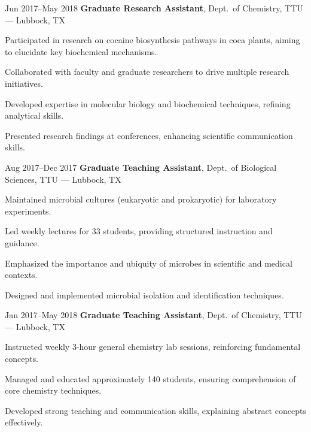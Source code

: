 \documentclass{resume}
\begin{document}
        \begin{twocolentry}{Jun 2017--May 2018}
            \textbf{Graduate Research Assistant}, Dept.\ of Chemistry, TTU --- Lubbock, TX
        \end{twocolentry}
        \begin{onecolentry}
            \begin{highlights}
                \item Participated in research on cocaine biosynthesis pathways in coca plants, aiming to elucidate key biochemical mechanisms.
                \item Collaborated with faculty and graduate researchers to drive multiple research initiatives.
                \item Developed expertise in molecular biology and biochemical techniques, refining analytical skills.
                \item Presented research findings at conferences, enhancing scientific communication skills.
            \end{highlights}
        \end{onecolentry}

        \begin{twocolentry}{Aug 2017--Dec 2017}
            \textbf{Graduate Teaching Assistant}, Dept.\ of Biological Sciences, TTU --- Lubbock, TX
        \end{twocolentry}
        \begin{onecolentry}
            \begin{highlights}
                \item Maintained microbial cultures (eukaryotic and prokaryotic) for laboratory experiments.
                \item Led weekly lectures for 33 students, providing structured instruction and guidance.
                \item Emphasized the importance and ubiquity of microbes in scientific and medical contexts.
                \item Designed and implemented microbial isolation and identification techniques.
            \end{highlights}
        \end{onecolentry}

        \begin{twocolentry}{Jan 2017--May 2018}
            \textbf{Graduate Teaching Assistant}, Dept.\ of Chemistry, TTU --- Lubbock, TX
        \end{twocolentry}
        \begin{onecolentry}
            \begin{highlights}
                \item Instructed weekly 3-hour general chemistry lab sessions, reinforcing fundamental concepts.
                \item Managed and educated approximately 140 students, ensuring comprehension of core chemistry techniques.
                \item Developed strong teaching and communication skills, explaining abstract concepts effectively.
            \end{highlights}
        \end{onecolentry}
\end{document}
